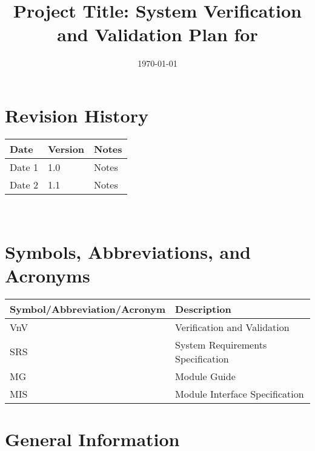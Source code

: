 \documentclass[12pt, titlepage]{article}
\begin{document}
\title{Project Title: System Verification and Validation Plan for \progname{}} 
\author{\authname}
\date{\today}
	
\maketitle


\section*{Revision History}

\begin{tabularx}{\textwidth}{p{3cm}p{2cm}X}
\toprule {\bf Date} & {\bf Version} & {\bf Notes}\\
\midrule
Date 1 & 1.0 & Notes\\
Date 2 & 1.1 & Notes\\
\bottomrule
\end{tabularx}

~\\
\newpage

\tableofcontents

\listoftables


\listoffigures


\newpage

\section{Symbols, Abbreviations, and Acronyms}

\renewcommand{\arraystretch}{1.2}
\begin{tabular}{ll}
\toprule
\textbf{Symbol/Abbreviation/Acronym} & \textbf{Description} \\
\midrule
VnV & Verification and Validation \\
SRS & System Requirements Specification \\
MG & Module Guide \\
MIS & Module Interface Specification \\
\bottomrule
\end{tabular}



\newpage



\section{General Information}
\end{document}
